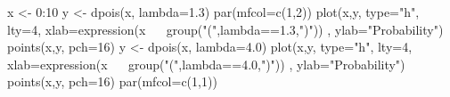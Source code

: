 \begin{Schunk}
\begin{Sinput}
 x <- 0:10
 y <- dpois(x, lambda=1.3)
 par(mfcol=c(1,2))
 plot(x,y, type="h", lty=4, xlab=expression(x ~~ group("(",lambda==1.3,")")) , ylab="Probability")
 points(x,y, pch=16)
 y <- dpois(x, lambda=4.0)
 plot(x,y, type="h", lty=4, xlab=expression(x ~~ group("(",lambda==4.0,")")) , ylab="Probability")
 points(x,y, pch=16)
 par(mfcol=c(1,1))
\end{Sinput}
\end{Schunk}
